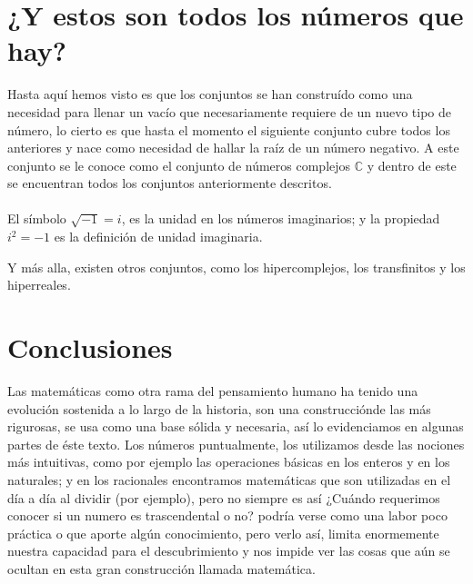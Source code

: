 \documentclass{article}
\begin{document}
\section{¿Y estos son todos los números que hay?}

Hasta aquí hemos visto es que los conjuntos se han construído como una necesidad para llenar un vacío que necesariamente requiere de un nuevo tipo de número, lo cierto es que hasta el momento el siguiente conjunto cubre todos los anteriores y nace como necesidad de hallar la raíz de un número negativo. A este conjunto se le conoce como el conjunto de números complejos $\mathbb{C}$ y dentro de este se encuentran todos los conjuntos anteriormente descritos.

\paragraph{} El símbolo $\sqrt{-1} = i$, es la unidad en los números imaginarios; y la propiedad $i^2 = -1$ es la definición de unidad imaginaria\cite{patino_duque_1977}.

Y más alla, existen otros conjuntos, como los hipercomplejos, los transfinitos y los hiperreales.

\section{Conclusiones}
Las matemáticas como otra rama del pensamiento humano ha tenido una evolución sostenida a lo largo de la historia, son una construcciónde las más rigurosas, se usa como una base sólida y necesaria, así lo evidenciamos en algunas partes de éste texto. Los números puntualmente, los utilizamos desde las nociones más intuitivas, como por ejemplo las operaciones básicas en los enteros y en los naturales; y en los racionales encontramos matemáticas que son utilizadas en el día a día al dividir (por ejemplo), pero no siempre es así ¿Cuándo requerimos conocer si un numero es trascendental o no? podría verse como una labor poco práctica o que aporte algún conocimiento, pero verlo así, limita enormemente nuestra capacidad para el descubrimiento y nos impide ver las cosas que aún se ocultan en esta gran construcción llamada matemática.

\nocite{*}


\end{document}
